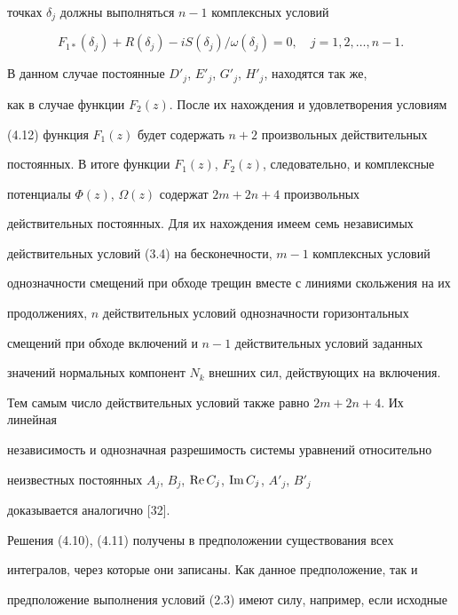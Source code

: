 точках $\delta_j$ должны выполняться $n-1$ комплексных условий 


\begin{equation} 


F_{1\ast}(\delta_j)+R(\delta_j)-iS(\delta_j)/\omega(\delta_j)=0, 


\quad j=1,2,\dotsc,n-1. 


\end{equation} 


 


В данном случае постоянные $D'_j$, $E'_j$, $G'_j$, $H'_j$, находятся так же, 


как в случае функции $F_2(z)$. После их нахождения и удовлетворения условиям 


(4.12) функция $F_1(z)$ будет содержать $n+2$ произвольных действительных 


постоянных. В итоге функции $F_1(z)$, $F_2(z)$, следовательно, и комплексные 


потенциалы $\Phi(z)$, $\Omega(z)$ содержат $2m+2n+4$ произвольных 


действительных постоянных. Для их нахождения имеем семь независимых 


действительных условий (3.4) на бесконечности, $m-1$ комплексных условий 


однозначности смещений при обходе трещин вместе с линиями скольжения на их 


продолжениях, $n$ действительных условий однозначности горизонтальных 


смещений при обходе включений и $n-1$ действительных условий заданных 


значений нормальных компонент $N_k$ внешних сил, действующих на включения. 


Тем самым число действительных условий также равно $2m+2n+4$. Их линейная 


независимость и однозначная разрешимость системы уравнений относительно 


неизвестных постоянных $A_j$, $B_j$, $\operatorname{Re} C_j$, $\operatorname{Im} C_j$, $A'_j$, $B'_j$ 


доказывается аналогично [32]. 


 


Решения (4.10), (4.11) получены в предположении существования всех 


интегралов, через которые они записаны. Как данное предположение, так и 


предположение выполнения условий (2.3) имеют силу, например, если исходные 


